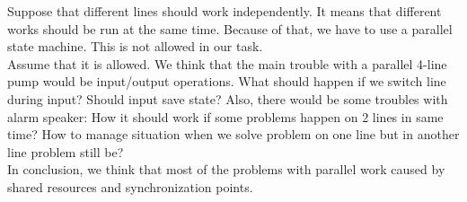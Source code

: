 \documentclass{article}
\begin{document}
Suppose that different lines should work independently. It means that different works should be run at the same time. Because of that, we have to use a parallel state machine. This is not allowed in our task.\\
Assume that it is allowed. We think that the main trouble with a parallel 4-line pump would be input/output operations. What should happen if we switch line during input? Should input save state? Also, there would be some troubles with alarm speaker: How it should work if some problems happen on 2 lines in same time? How to manage situation when we solve problem on one line but in another line problem still be?\\
In conclusion, we think that most of the problems with parallel work caused by shared resources and synchronization points.
\end{document}
